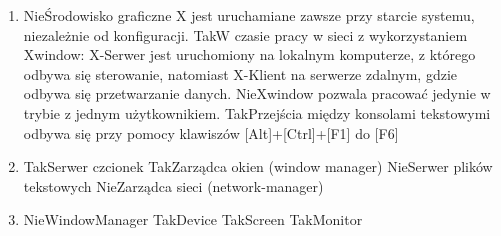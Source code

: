 \begin{enumerate}
	\item {}
	{Nie}{Środowisko graficzne X jest uruchamiane zawsze przy starcie systemu, niezależnie od konfiguracji.}
	{Tak}{W czasie pracy w sieci z wykorzystaniem Xwindow: X-Serwer jest uruchomiony na lokalnym komputerze, z którego odbywa się sterowanie, natomiast X-Klient na serwerze zdalnym, gdzie odbywa się przetwarzanie danych.}
	{Nie}{Xwindow pozwala pracować jedynie w trybie z jednym użytkownikiem.}
	{Tak}{Przejścia między konsolami tekstowymi odbywa się przy pomocy klawiszów [Alt]+[Ctrl]+[F1] do [F6]}
	
	\item {}
	{Tak}{Serwer czcionek}
	{Tak}{Zarządca okien (window manager)}
	{Nie}{Serwer plików tekstowych}
	{Nie}{Zarządca sieci (network-manager)}
	
	\item {}
	{Nie}{WindowManager}
	{Tak}{Device}
	{Tak}{Screen}
	{Tak}{Monitor}
\end{enumerate}
